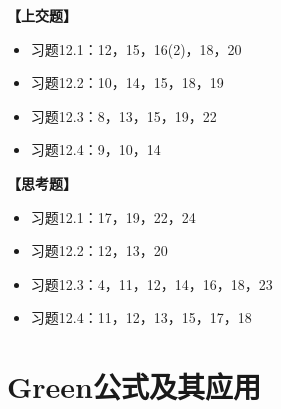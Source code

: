 {\bf 【上交题】}

\begin{itemize}
  \setlength{\itemindent}{1cm}
  \item 习题12.1：12，15，16(2)，18，20
  \item 习题12.2：10，14，15，18，19
  \item 习题12.3：8，13，15，19，22
  \item 习题12.4：9，10，14
\end{itemize}

{\bf 【思考题】}

\begin{itemize}
  \setlength{\itemindent}{1cm}
  \item 习题12.1：17，19，22，24
  \item 习题12.2：12，13，20
  \item 习题12.3：4，11，12，14，16，18，23
  \item 习题12.4：11，12，13，15，17，18
\end{itemize}

\newpage

\setcounter{section}{1}

\section{Green公式及其应用}

